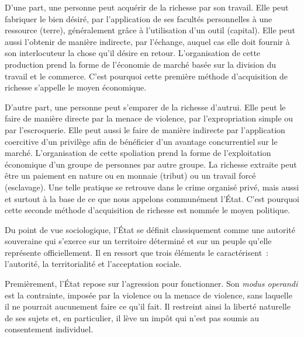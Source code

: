 D'une part, une personne peut acquérir de la richesse par son travail. Elle peut fabriquer le bien désiré, par l'application de ses facultés personnelles à une ressource (terre), généralement grâce à l'utilisation d'un outil (capital). Elle peut aussi l'obtenir de manière indirecte, par l'échange, auquel cas elle doit fournir à son interlocuteur la chose qu'il désire en retour. L'organisation de cette production prend la forme de l'économie de marché basée sur la division du travail et le commerce. C'est pourquoi cette première méthode d'acquisition de richesse s'appelle le moyen économique.

D'autre part, une personne peut s'emparer de la richesse d'autrui. Elle peut le faire de manière directe par la menace de violence, par l'expropriation simple ou par l'escroquerie. Elle peut aussi le faire de manière indirecte par l'application coercitive d'un privilège afin de bénéficier d'un avantage concurrentiel sur le marché. L'organisation de cette spoliation prend la forme de l'exploitation économique d'un groupe de personnes par autre groupe. La richesse extraite peut être un paiement en nature ou en monnaie (tribut) ou un travail forcé (esclavage). Une telle pratique se retrouve dans le crime organisé privé, mais aussi et surtout à la base de ce que nous appelons communément l'État. C'est pourquoi cette seconde méthode d'acquisition de richesse est nommée le moyen politique.

Du point de vue sociologique, l'État se définit classiquement comme une autorité souveraine qui s'exerce sur un territoire déterminé et sur un peuple qu'elle représente officiellement. Il en ressort que trois éléments le caractérisent~: l'autorité, la territorialité et l'acceptation sociale.

Premièrement, l'État repose sur l'agression pour fonctionner. Son \emph{modus operandi} est la contrainte, imposée par la violence ou la menace de violence, sans laquelle il ne pourrait aucunement faire ce qu'il fait. Il restreint ainsi la liberté naturelle de ses sujets et, en particulier, il lève un impôt qui n'est pas soumis au consentement individuel.

